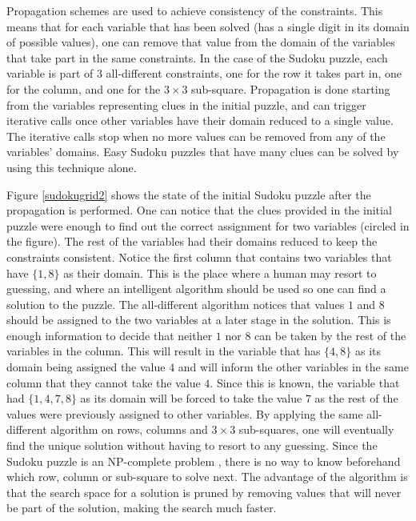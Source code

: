 \documentclass{l4proj}
\begin{document}
\noindent Propagation schemes are used to achieve consistency of the constraints. This means that for each variable that has been solved (has a single digit in its domain of possible values), one can remove that value from the domain of the variables that take part in the same constraints. In the case of the Sudoku puzzle, each variable is part of $3$ all-different constraints, one for the row it takes part in, one for the column, and one for the $3\times 3$ sub-square. Propagation is done starting from the variables representing clues in the initial puzzle, and can trigger iterative calls once other variables have their domain reduced to a single value. The iterative calls stop when no more values can be removed from any of the variables' domains. Easy Sudoku puzzles that have many clues \cite{gomes2002completing} can be solved by using this technique alone.

\noindent Figure \ref{sudokugrid2} shows the state of the initial Sudoku puzzle after the propagation is performed. One can notice that the clues provided in the initial puzzle were enough to find out the correct assignment for two variables (circled in the figure). The rest of the variables had their domains reduced to keep the constraints consistent. Notice the first column that contains two variables that have $\{1, 8\}$ as their domain. This is the place where a human may resort to guessing, and where an intelligent algorithm should be used so one can find a solution to the puzzle. The all-different algorithm notices that values $1$ and $8$ should be assigned to the two variables at a later stage in the solution. This is enough information to decide that neither $1$ nor $8$ can be taken by the rest of the variables in the column. This will result in the variable that has $\{4, 8\}$ as its domain being assigned the value $4$ and will inform the other variables in the same column that they cannot take the value $4$. Since this is known, the variable that had $\{1, 4, 7, 8\}$ as its domain will be forced to take the value $7$ as the rest of the values were previously assigned to other variables. By applying the same all-different algorithm on rows, columns and $3\times 3$ sub-squares, one will eventually find the unique solution without having to resort to any guessing. Since the Sudoku puzzle is an NP-complete problem \cite{colbourn1984complexity}, there is no way to know beforehand which row, column or sub-square to solve next. The advantage of the algorithm is that the search space for a solution is pruned by removing values that will never be part of the solution, making the search much faster.
\end{document}
